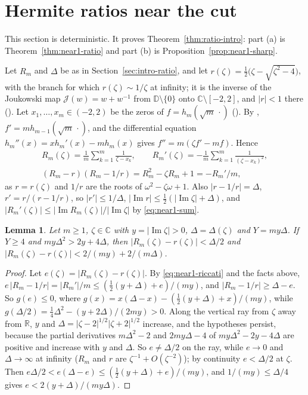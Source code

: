 \documentclass[11pt]{amsart}
\newtheorem{lemma}[theorem]{Lemma}
\theoremstyle{definition}
\theoremstyle{remark}
\numberwithin{equation}{section}
\newcommand{\C}{\mathbb{C}}
\newcommand{\R}{\mathbb{R}}
\newcommand{\D}{\mathbb{D}}
\DeclareMathOperator{\im}{Im}
\begin{document}
\section{Hermite ratios near the cut}\label{sec:ratio}
This section is deterministic. It proves Theorem~\ref{thm:ratio-intro}: part (a) is Theorem~\ref{thm:near1-ratio} and part (b) is Proposition~\ref{prop:near1-sharp}.

Let $R_m$ and $\Delta$ be as in Section~\ref{sec:intro-ratio}, and let $r(\zeta)=\frac12\bigl(\zeta-\sqrt{\zeta^2-4}\bigr)$, with the branch for which $r(\zeta)\sim1/\zeta$ at infinity; it is the inverse of the Joukowski map $\mathcal J(w)=w+w^{-1}$ from $\D\setminus\{0\}$ onto $\C\setminus[-2,2]$, and $|r|<1$ there (\cite[Section~\ref{M-sec:prelim}]{Main}). Let $x_1,\dots,x_m\in(-2,2)$ be the zeros of $f=h_m(\sqrt m\,\cdot)$ (\cite[Lemma~\ref{M-lem:zeros}]{Main}). By \cite[\eqref{M-eq:recurrence}]{Main}, $f'=mh_{m-1}(\sqrt m\,\cdot)$, and the differential equation $h_m''(x)=xh_m'(x)-mh_m(x)$ gives $f''=m(\zeta f'-mf)$. Hence
\begin{gather}
R_m(\zeta)=\frac1m\sum_{k=1}^m\frac1{\zeta-x_k},\qquad R_m'(\zeta)=-\frac1m\sum_{k=1}^m\frac1{(\zeta-x_k)^2},\label{eq:near1-sum}\\
(R_m-r)(R_m-1/r)=R_m^2-\zeta R_m+1=-R_m'/m,\label{eq:near1-riccati}
\end{gather}
as $r=r(\zeta)$ and $1/r$ are the roots of $\omega^2-\zeta\omega+1$. Also $|r-1/r|=\Delta$, $r'=r/(r-1/r)$, so $|r'|\le1/\Delta$, $|\im r|\le\frac12(|\im\zeta|+\Delta)$, and $|R_m'(\zeta)|\le|\im R_m(\zeta)|/|\im\zeta|$ by \eqref{eq:near1-sum}.


\begin{lemma}\label{lem:near1-riccati}
Let $m\ge1$, $\zeta\in\C$ with $y=|\im\zeta|>0$, $\Delta=\Delta(\zeta)$ and $Y=my\Delta$. If $Y\ge4$ and $my\Delta^2>2y+4\Delta$, then $|R_m(\zeta)-r(\zeta)|<\Delta/2$ and $|R_m(\zeta)-r(\zeta)|<2/(my)+2/(m\Delta)$.
\end{lemma}

\begin{proof}
Let $e(\zeta)=|R_m(\zeta)-r(\zeta)|$. By \eqref{eq:near1-riccati} and the facts above, $e\,|R_m-1/r|=|R_m'|/m\le(\frac12(y+\Delta)+e)/(my)$, and $|R_m-1/r|\ge\Delta-e$. So $g(e)\le0$, where $g(x)=x(\Delta-x)-(\frac12(y+\Delta)+x)/(my)$, while $g(\Delta/2)=\frac14\Delta^2-(y+2\Delta)/(2my)>0$. Along the vertical ray from $\zeta$ away from $\R$, $y$ and $\Delta=|\zeta-2|^{1/2}|\zeta+2|^{1/2}$ increase, and the hypotheses persist, because the partial derivatives $m\Delta^2-2$ and $2my\Delta-4$ of $my\Delta^2-2y-4\Delta$ are positive and increase with $y$ and $\Delta$. So $e\ne\Delta/2$ on the ray, while $e\to0$ and $\Delta\to\infty$ at infinity ($R_m$ and $r$ are $\zeta^{-1}+O(\zeta^{-2})$); by continuity $e<\Delta/2$ at $\zeta$. Then $e\Delta/2<e(\Delta-e)\le(\frac12(y+\Delta)+e)/(my)$, and $1/(my)\le\Delta/4$ gives $e<2(y+\Delta)/(my\Delta)$.
\end{proof}
\end{document}

